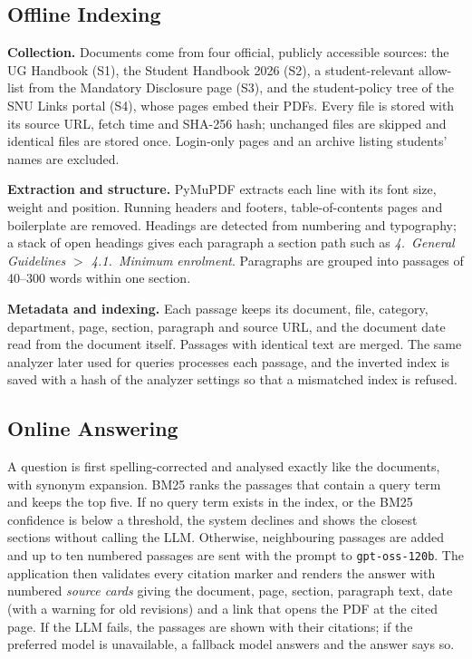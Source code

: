 \documentclass[conference]{IEEEtran}
\newcommand{\code}[1]{\texttt{#1}}
\begin{document}
\subsection{Offline Indexing}
\textbf{Collection.} Documents come from four official, publicly accessible sources: the UG Handbook (S1), the Student Handbook 2026 (S2), a student-relevant allow-list from the Mandatory Disclosure page (S3), and the student-policy tree of the SNU Links portal (S4), whose pages embed their PDFs. Every file is stored with its source URL, fetch time and SHA-256 hash; unchanged files are skipped and identical files are stored once. Login-only pages and an archive listing students' names are excluded.

\textbf{Extraction and structure.} PyMuPDF extracts each line with its font size, weight and position. Running headers and footers, table-of-contents pages and boilerplate are removed. Headings are detected from numbering and typography; a stack of open headings gives each paragraph a section path such as \emph{4.~General Guidelines $>$ 4.1.~Minimum enrolment}. Paragraphs are grouped into passages of 40--300 words within one section.

\textbf{Metadata and indexing.} Each passage keeps its document, file, category, department, page, section, paragraph and source URL, and the document date read from the document itself. Passages with identical text are merged. The same analyzer later used for queries processes each passage, and the inverted index is saved with a hash of the analyzer settings so that a mismatched index is refused.

\subsection{Online Answering}
A question is first spelling-corrected and analysed exactly like the documents, with synonym expansion. BM25 ranks the passages that contain a query term and keeps the top five. If no query term exists in the index, or the BM25 confidence is below a threshold, the system declines and shows the closest sections without calling the LLM. Otherwise, neighbouring passages are added and up to ten numbered passages are sent with the prompt to \code{gpt-oss-120b}. The application then validates every citation marker and renders the answer with numbered \emph{source cards} giving the document, page, section, paragraph text, date (with a warning for old revisions) and a link that opens the PDF at the cited page. If the LLM fails, the passages are shown with their citations; if the preferred model is unavailable, a fallback model answers and the answer says so.
\end{document}
